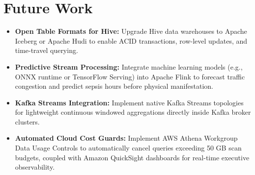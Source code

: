 \documentclass[12pt,a4paper]{report}
\begin{document}
\section{Future Work}
\begin{itemize}
    \item \textbf{Open Table Formats for Hive:} Upgrade Hive data warehouses to Apache Iceberg or Apache Hudi to enable ACID transactions, row-level updates, and time-travel querying.
    \item \textbf{Predictive Stream Processing:} Integrate machine learning models (e.g., ONNX runtime or TensorFlow Serving) into Apache Flink to forecast traffic congestion and predict sepsis hours before physical manifestation.
    \item \textbf{Kafka Streams Integration:} Implement native Kafka Streams topologies for lightweight continuous windowed aggregations directly inside Kafka broker clusters.
    \item \textbf{Automated Cloud Cost Guards:} Implement AWS Athena Workgroup Data Usage Controls to automatically cancel queries exceeding 50 GB scan budgets, coupled with Amazon QuickSight dashboards for real-time executive observability.
\end{itemize}
\end{document}

